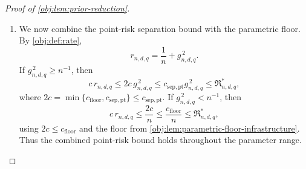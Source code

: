 \begin{proof}[Proof of \cref{obj:lem:prior-reduction}]
\begin{enumerate}
\[=2a_{\mathrm{len}}.
\]
Since interval length is nonnegative everywhere,
\[
2a_{\mathrm{len}}\,
\mathbf1_{E_{\mathrm L,\alpha}\cap E_{\mathrm R,\alpha}}(o)
\le U_I(o)-L_I(o).
\]
Integration under the plus mixture, followed by its defining mixture
identity, therefore gives
\[
\begin{aligned}
2a_{\mathrm{len}}\,
Q_{+,\mathrm{len}}^{(n)}
 (E_{\mathrm L,\alpha}\cap E_{\mathrm R,\alpha})
&\le
\int_{O^n}(U_I(o)-L_I(o))\,Q_{+,\mathrm{len}}^{(n)}(do)\\
&=
\int_{\mathcal M(d,q)}
\mathbb E_P[U_I(O^n)-L_I(O^n)]\,\Pi_{+,\mathrm{len}}(dP)\\
&\le
\sup_{P\in\mathcal M(d,q)}
\mathbb E_P[U_I(O^n)-L_I(O^n)].
\end{aligned}
\]
Multiplication of the intersection bound by \(2a_{\mathrm{len}}\ge0\)
and substitution of \(\beta_\alpha\) yield
\[
\begin{aligned}
\sup_{P\in\mathcal M(d,q)}
\mathbb E_P[U_I(O^n)-L_I(O^n)]
&\ge2a_{\mathrm{len}}(1-2\alpha-3\beta_\alpha)\\
&=2a_{\mathrm{len}}\frac58(1-2\alpha)\\
&=\frac54c_{\beta_\alpha}(1-2\alpha)g_{n,d,q}.
\end{aligned}
\]
Lengths lie in \([0,2]\), justifying these integrations, and the constant
interval \([-1,1]\) is honest because \(\tau(P)\in[-1,1]\).
Taking the infimum in \cref{obj:def:length-risk} proves
\[
\mathfrak L^*_{n,d,q,\alpha}
\ge c_{\mathrm{sep,len},\alpha}g_{n,d,q}
=\frac54c_{\beta_\alpha}(1-2\alpha)g_{n,d,q}.
\]

\item We now combine the point-risk separation bound with the parametric
floor. By \cref{obj:def:rate},
\[
r_{n,d,q}=\frac1n+g_{n,d,q}^{\,2}.
\]
If \(g_{n,d,q}^{\,2}\ge n^{-1}\), then
\[
c\,r_{n,d,q}
\le 2c\,g_{n,d,q}^{\,2}
\le c_{\mathrm{sep,pt}}g_{n,d,q}^{\,2}
\le\mathfrak R^*_{n,d,q},
\]
where \(2c=\min\{c_{\mathrm{floor}},c_{\mathrm{sep,pt}}\}\le c_{\mathrm{sep,pt}}\).
If \(g_{n,d,q}^{\,2}<n^{-1}\), then
\[
c\,r_{n,d,q}
\le \frac{2c}{n}
\le \frac{c_{\mathrm{floor}}}{n}
\le\mathfrak R^*_{n,d,q},
\]
using \(2c\le c_{\mathrm{floor}}\) and the floor from
\cref{obj:lem:parametric-floor-infrastructure}.
Thus the combined point-risk bound holds throughout the parameter range.


\end{enumerate}
\end{proof}
